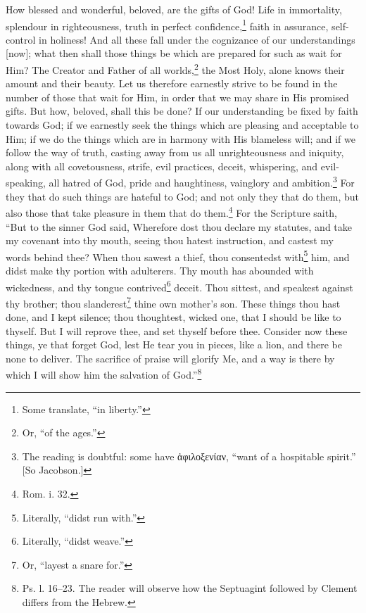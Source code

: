 How blessed and wonderful, beloved, are the gifts of God! Life in immortality, splendour in righteousness, truth in perfect confidence,\footnote{Some translate, “in liberty.”} faith in assurance, self-control in holiness! And all these fall under the cognizance of our understandings [now]; what then shall those things be which are prepared for such as wait for Him? The Creator and Father of all worlds,\footnote{Or, “of the ages.”} the Most Holy, alone knows their amount and their beauty. Let us therefore earnestly strive to be found in the number of those that wait for Him, in order that we may share in His promised gifts. But how, beloved, shall this be done? If our understanding be fixed by faith towards God; if we earnestly seek the things which are pleasing and acceptable to Him; if we do the things which are in harmony with His blameless will; and if we follow the way of truth, casting away from us all unrighteousness and iniquity, along with all covetousness, strife, evil practices, deceit, whispering, and evil-speaking, all hatred of God, pride and haughtiness, vainglory and ambition.\footnote{The reading is doubtful: some have \textgreek{ἀφιλοξενίαν}, “want of a hospitable spirit.” [So Jacobson.]} For they that do such things are hateful to God; and not only they that do them, but also those that take pleasure in them that do them.\footnote{Rom. i. 32.} For the Scripture saith, “But to the sinner God said, Wherefore dost thou declare my statutes, and take my covenant into thy mouth, seeing thou hatest instruction, and castest my words behind thee? When thou sawest a thief, thou consentedst with\footnote{Literally, “didst run with.”} him, and didst make thy portion with adulterers. Thy mouth has abounded with wickedness, and thy tongue contrived\footnote{Literally, “didst weave.”} deceit. Thou sittest, and speakest against thy brother; thou slanderest\footnote{Or, “layest a snare for.”} thine own mother’s son. These things thou hast done, and I kept silence; thou thoughtest, wicked one, that I should be like to thyself. But I will reprove thee, and set thyself before thee. Consider now these things, ye that forget God, lest He tear you in pieces, like a lion, and there be none to deliver. The sacrifice of praise will glorify Me, and a way is there by which I will show him the salvation of God.”\footnote{Ps. l. 16–23. The reader will observe how the Septuagint followed by Clement differs from the Hebrew.}


